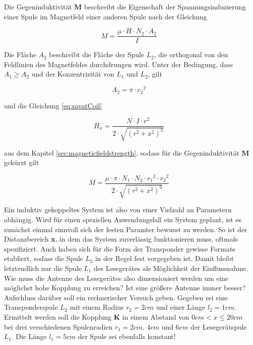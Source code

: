 {{\noindent Die Gegeninduktivität \textbf{M} beschreibt die Eigenschaft der Spannungsinduzierung einer Spule im Magnetfeld einer anderen Spule nach der Gleichung

\begin{equation}
  M = \frac{\mu \cdot H \cdot N_2 \cdot A_2}{I}
\end{equation}

\noindent Die Fläche \(A_2\) beschreibt die Fläche der Spule \(L_2\), die orthogonal von den Feldlinien des Magnetfeldes durchdrungen wird. Unter der Bedingung, dass \(A_1 \geq A_2\) und der Konzentrizität von \(L_1\) und \(L_2\), gilt

\begin{equation}
  A_2 = \pi \cdot {r_2}^2
\end{equation}

\noindent und die Gleichung \eqref{eq:savatCoil}

\begin{equation}
  H_x = \frac{N \cdot I \cdot r^2}{2 \cdot \sqrt{(r^2 + x^2)^3}}
\end{equation}

\noindent aus dem Kapitel \ref{sec:magneticfieldstrength}, sodass für die Gegeninduktivität \textbf{M} gekürzt gilt

\begin{equation}
  M = \frac{\mu \cdot \pi \cdot N_1 \cdot N_2 \cdot {r_1}^2 \cdot {r_2}^2}{2 \cdot \sqrt{(r^2 + x^2)^3}}
  \label{eq:mutualInductance}
\end{equation}

\noindent Ein induktiv gekoppeltes System ist also von einer Vielzahl an Parametern abhängig. Wird für einen speziellen Anwendungsfall ein System geplant, ist es zunächst einmal sinnvoll sich der festen Paramter bewusst zu werden. So ist der Distanzbereich \textbf{x}, in dem das System zuverlässig funktionieren muss, oftmals spezifiziert. Auch haben sich für die Form der Transponder gewisse Formate etabliert, sodass die Spule \(L_2\) in der Regel fest vorgegeben ist. Damit bleibt letztendlich nur die Spule \(L_1\) des Lesegerätes als Möglichkeit der Einflussnahme. Wie muss die Antenne des Lesegerätes also dimensioniert werden um eine möglichst hohe Kopplung zu erreichen? Ist eine größere Antenne immer besser? Aufschluss darüber soll ein rechnerischer Versuch geben. Gegeben sei eine Transponderspule \(L_2\) mit einem Radius \(r_2 = 2cm\) und einer Länge \(l_2 = 1cm\). Ermittelt werden soll die Kopplung \textbf{K} in einem Abstand von \(0cm < x \leq 20cm\) bei drei verschiedenen Spulenradien \(r_1 = 2cm\), \(4cm\) und \(6cm\) der Lesegerätspule \(L_1\). Die Länge \(l_1 = 5cm\) der Spule sei ebenfalls konstant! 

}}
